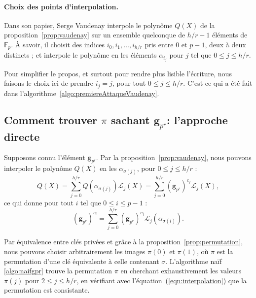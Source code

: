 \documentclass[a4paper, titlepage, 11pt]{article}
\theoremstyle{definition}
\theoremstyle{remark}
\def\gf #1{\mathbb{F}_{#1}}
\def\mbf #1{\mathbf{#1}}
\begin{document}
\paragraph{Choix des points d'interpolation.}

Dans son papier, Serge Vaudenay interpole le polynôme $Q(X)$ de la proposition~\ref{prop:vaudenay} sur un ensemble quelconque de $h/r+1$ éléments de $\gf{p}$. À savoir, il choisit des indices $i_0, i_1, \dots, i_{h/r}$ pris entre $0$ et $p-1$, deux à deux distincts ; et interpole le polynôme en les éléments $\alpha_{i_j}$ pour $j$ tel que $0 \leqslant j \leqslant h/r$.

Pour simplifier le propos, et surtout pour rendre plus lisible l'écriture, nous faisons le choix ici de prendre $i_j = j$, pour tout $0 \leqslant j \leqslant h/r$. C'est ce qui a été fait dans l'algorithme~\ref{algo:premiereAttaqueVaudenay}.

\subsection{Comment trouver $\pi$ sachant $\mbf g_{p^r}$: l'approche directe}

Supposons connu l'élément $\mbf g_{p^r}$. Par la proposition~\ref{prop:vaudenay}, nous pouvons interpoler le polynôme $Q(X)$ en les $\alpha_{\sigma(j)}$, pour $0 \leqslant j \leqslant h/r$ :
$$ Q(X) = \sum_{j=0}^{h/r} Q\left(\alpha_{\sigma(j)}\right) \mathcal L_j(X) = \sum_{j=0}^{h/r} (\mbf g_{p^r})^{c_{j}} \mathcal L_j(X),$$
ce qui donne pour tout $i$ tel que $0\leqslant i \leqslant p-1$ :
\begin{equation}\label{eqn:interpolation}
(\mbf g_{p^r})^{c_i} = \sum_{j=0}^{h/r} (\mbf g_{p^r})^{c_{j}} \mathcal L_j(\alpha_{\sigma(i)}).
\end{equation}

Par équivalence entre clés privées et grâce à la proposition~\ref{prop:permutation}, nous pouvons choisir arbitrairement les images $\pi(0)$ et $\pi(1)$, où $\pi$ est la permutation d'une clé équivalente à celle contenant $\sigma$. L'algorithme naïf \ref{algo:naifgpr} trouve la permutation $\pi$ en cherchant exhaustivement les valeurs $\pi(j)$ pour $2\leqslant j \leqslant h/r$, en vérifiant avec l'équation~(\ref{eqn:interpolation}) que la permutation est consistante.
\end{document}
